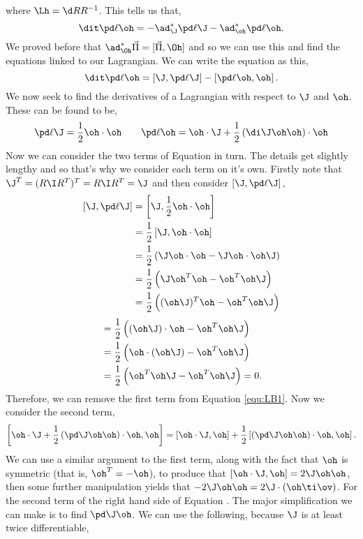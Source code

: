 where $\Lh = \d R R^{-1}$. This tells us that,
$$ \dit\pd \ell \oh = -\ad^*_\J \pd \ell \J - \ad^*_{\oh} \pd \ell \oh. $$
We proved before that $\ad^*_{\Oh}\vec\Pi = [\vec\Pi, \Oh]$ and so we can use this and find the equations linked to our Lagrangian. We can write the equation as this,
\begin{equation}
  \dit\pd \ell \oh = \left[\J, \pd \ell \J\right] - \left[\pd \ell \oh, \oh\right].\label{equ:LB1}
\end{equation}
We now seek to find the derivatives of a Lagrangian with respect to $\J$ and $\oh$. These can be found to be,
$$ \pd \ell \J = \frac{1}{2}\oh \cdot \oh \qquad \pd \ell \oh = \oh \cdot \J + \frac{1}{2}\left( \di \J \oh \oh \right) \cdot \oh $$
Now we can consider the two terms of Equation  in turn. The details get slightly lengthy and so that's why we consider each term on it's own. Firstly note that $\J^T = (R\I R^T)^T = R\I R^T = \J$ and then consider $\left[ \J, \pd \ell \J \right]$,
\begin{align*}
  \left[ \J, \pd \ell \J \right] &= \left[ \J, \frac{1}{2}\oh \cdot \oh \right]\\
  &= \frac{1}{2}\left[ \J, \oh \cdot \oh \right]\\
  &= \frac{1}{2}\left(\J\oh \cdot \oh - \J\oh \cdot \oh\J \right)\\
  &= \frac{1}{2}\left(\J\oh^T \oh - \oh^T \oh\J \right)\\
  &= \frac{1}{2}\left((\oh\J)^T \oh - \oh^T \oh\J \right)
\end{align*}
\begin{align*}
  &= \frac{1}{2}\left((\oh\J) \cdot \oh - \oh^T \oh\J \right)\\
  &= \frac{1}{2}\left(\oh \cdot (\oh\J) - \oh^T \oh\J \right)\\
  &= \frac{1}{2}\left(\oh^T\oh\J - \oh^T \oh\J \right) = 0.
\end{align*}
Therefore, we can remove the first term from Equation \ref{equ:LB1}. Now we consider the second term,
\begin{equation}
  \left[ \oh \cdot \J + \frac{1}{2}\left( \pd \J \oh \oh \right) \cdot \oh, \oh \right] = \left[ \oh \cdot \J, \oh\right] + \frac{1}{2}\left[\left( \pd \J \oh \oh \right) \cdot \oh, \oh \right].\label{equ:LB2}
\end{equation}
We can use a similar argument to the first term, along with the fact that $\oh$ is symmetric (that is, $\oh^T = -\oh$), to produce that $\left[ \oh \cdot \J, \oh\right] = 2\J \oh \oh$, then some further manipulation yields that $-2\J \oh\oh = 2\J \cdot (\oh \ti \ov)$. For the second term of the right hand side of Equation . The major simplification we can make is to find $\pd \J \oh$. We can use the following, because $\J$ is at least twice differentiable,

